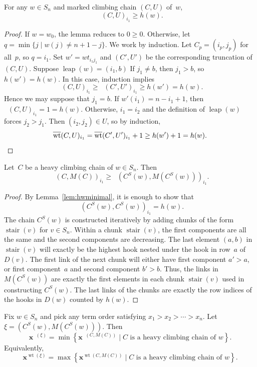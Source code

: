 \documentclass[ALCO]{cedram}
\DeclareMathOperator{\leap}{\mathrm{leap}}
\DeclareMathOperator{\stair}{\mathrm{stair}}
\DeclareMathOperator{\wt}{\mathrm{wt}}
\DeclareMathOperator{\dwt}{\overline{\mathrm{wt}}}
\newcommand{\CS}{C^S}
\begin{document}
\begin{lemma}
	\label{lem:hwminimal}
	For any $w\in S_n$ and marked climbing chain $(C,U)$ of~$w$, 
	\[\dwt(C,U)_{i_1}\geq h(w). \]
\end{lemma}
\begin{proof}
	If $w=w_0$, the lemma reduces to $0\geq 0$. Otherwise, let $q=\min\{j\mid w(j)\neq n+1-j\}$. We work by induction. Let $C_p=(i_p,j_p)$ for all~$p$, so $q=i_1$. Set $w'=wt_{i_1j_1}$ and $(C',U')$ be the corresponding truncation of $(C,U)$. Suppose $\leap(w)=(i_1,b)$ If $j_1\neq b$, then $j_1>b$, so $h(w')=h(w)$. In this case, induction implies
	\[\dwt(C,U)_{i_1} \geq \dwt(C',U')_{i_1} \geq h(w')=h(w). \] 
	Hence we may suppose that $j_1=b$. If $w'(i_1)=n-i_1+1$, then $\dwt(C,U)_{i_1}=1=h(w)$. Otherwise, $i_1=i_2$ and the definition of $\leap(w)$ forces $j_2>j_1$. Then $(i_2,j_2)\in U$, so by induction,
	\[\dwt(C,U)_{i_1} = \dwt(C',U')_{i_1}+1 \geq h(w')+1 = h(w). \qedhere\]
\end{proof}

\begin{lemma}
	\label{lem:heavyminfirstmarks}
	Let~$C$ be a heavy climbing chain of $w\in S_n$. Then
	\[\dwt(C,M(C))_{i_1}\geq \dwt(\CS(w),M(\CS(w)))_{i_1}. \]
\end{lemma}
\begin{proof}
	By Lemma~\ref{lem:hwminimal}, it is enough to show that 
	\[\dwt(\CS(w),\CS(w))_{i_1} = h(w). \]
	The chain $\CS(w)$ is constructed iteratively by adding chunks of the form $\stair(v)$ for $v\in S_n$. Within a chunk $\stair(v)$, the first components are all the same and the second components are decreasing. The last element $(a,b)$ in $\stair(v)$ will exactly be the highest hook nested under the hook in row~$a$ of $D(v)$. The first link of the next chunk will either have first component $a'>a$, or first component~$a$ and second component $b'>b$. Thus, the links in $M(\CS(w))$ are exactly the first elements in each chunk $\stair(v)$ used in constructing $\CS(w)$. The last links of the chunks are exactly the row indices of the hooks in $D(w)$ counted by $h(w)$.
\end{proof}


\begin{conjecture}
	\label{conj:staircaseleading}
	Fix $w\in S_n$ and pick any term order satisfying $x_1>x_2>\cdots>x_n$. Let $\xi=(\CS(w),M(\CS(w)))$. Then
	\[\bm{x}^{\dwt(\xi)} = \min \left\{\bm{x}^{\dwt(C,M(C))} \mid C \mbox{ is a heavy climbing chain of } w \right\}. \] 
	Equivalently,
	\[\bm{x}^{\wt(\xi)} = \max \left\{\bm{x}^{\wt(C,M(C))} \mid C \mbox{ is a heavy climbing chain of } w \right\}. \] 
\end{conjecture}
\end{document}
